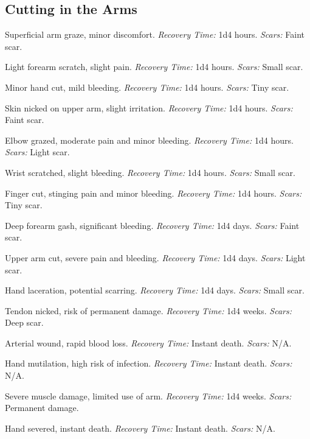 \subsection{Cutting in the Arms}

\begin{description}[labelwidth=1.5em, leftmargin=*, itemsep=0.4em]
    \item[01 -] Superficial arm graze, minor discomfort. \textit{Recovery Time:} 1d4 hours. \textit{Scars:} Faint scar.
    \item[02 -] Light forearm scratch, slight pain. \textit{Recovery Time:} 1d4 hours. \textit{Scars:} Small scar.
    \item[03 -] Minor hand cut, mild bleeding. \textit{Recovery Time:} 1d4 hours. \textit{Scars:} Tiny scar.
    \item[04 -] Skin nicked on upper arm, slight irritation. \textit{Recovery Time:} 1d4 hours. \textit{Scars:} Faint scar.
    \item[05 -] Elbow grazed, moderate pain and minor bleeding. \textit{Recovery Time:} 1d4 hours. \textit{Scars:} Light scar.
    \item[06 -] Wrist scratched, slight bleeding. \textit{Recovery Time:} 1d4 hours. \textit{Scars:} Small scar.
    \item[07 -] Finger cut, stinging pain and minor bleeding. \textit{Recovery Time:} 1d4 hours. \textit{Scars:} Tiny scar.
    \item[08 -] Deep forearm gash, significant bleeding. \textit{Recovery Time:} 1d4 days. \textit{Scars:} Faint scar.
    \item[09 -] Upper arm cut, severe pain and bleeding. \textit{Recovery Time:} 1d4 days. \textit{Scars:} Light scar.
    \item[10 -] Hand laceration, potential scarring. \textit{Recovery Time:} 1d4 days. \textit{Scars:} Small scar.
    \item[11 -] Tendon nicked, risk of permanent damage. \textit{Recovery Time:} 1d4 weeks. \textit{Scars:} Deep scar.
    \item[12 -] Arterial wound, rapid blood loss. \textit{Recovery Time:} Instant death. \textit{Scars:} N/A.
    \item[13 -] Hand mutilation, high risk of infection. \textit{Recovery Time:} Instant death. \textit{Scars:} N/A.
    \item[14 -] Severe muscle damage, limited use of arm. \textit{Recovery Time:} 1d4 weeks. \textit{Scars:} Permanent damage.
    \item[15 -] Hand severed, instant death. \textit{Recovery Time:} Instant death. \textit{Scars:} N/A.

\end{description}
